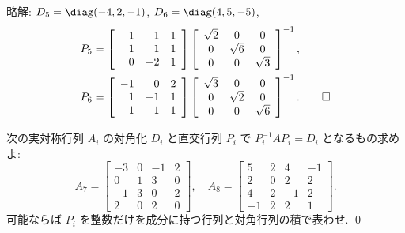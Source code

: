 \documentclass[12pt,twoside]{jarticle}
\newcommand\commentout[1]{#1}
\newcommand\commentout[1]{}
\begin{document}
\commentout{
\noindent
略解: $D_5=\diag(-4,2,-1)$, $D_6=\diag(4,5,-5)$, 
\begin{align*}
  &
  P_5 = 
  \left[ 
    \begin{array}{rrr}
      -1 & 1 & 1 \\
      1 & 1 & 1 \\
      0 & -2 & 1
    \end{array}
  \right]
  \left[ 
    \begin{array}{ccc}
      \sqrt {2} & 0 & 0 \\
      0 & \sqrt {6} & 0 \\
      0 & 0 & \sqrt {3}
    \end{array}
  \right]^{-1},
  \\ &
  P_6 =
  \left[ 
    \begin{array}{rrr}
      -1 & 0 & 2 \\
      1 & -1 & 1 \\
      1 & 1 & 1
    \end{array}
  \right]
  \left[ 
    \begin{array}{ccc}
      \sqrt {3} & 0 & 0 \\
      0 & \sqrt {2} & 0 \\
      0 & 0 & \sqrt {6}
    \end{array}
  \right]^{-1}.
  \qed
\end{align*}
}


\begin{question}
\label{q:ars-4}
  次の実対称行列 $A_i$ の対角化 $D_i$ と直交行列 $P_i$ で $P_i^{-1}AP_i=D_i$ 
  となるもの求めよ:
  \begin{equation*}
    A_7 =
    \left[ 
      \begin{array}{rrrr}
        -3 & 0 & -1 & 2 \\
        0 & 1 & 3 & 0 \\
        -1 & 3 & 0 & 2 \\
        2 & 0 & 2 & 0
      \end{array}
    \right],
    \quad
    A_8 =
    \left[ 
      \begin{array}{rrrr}
        5 & 2 & 4 & -1 \\
        2 & 0 & 2 & 2 \\
        4 & 2 & -1 & 2 \\
        -1 & 2 & 2 & 1
      \end{array}
    \right].
  \end{equation*}
  可能ならば $P_i$ を整数だけを成分に持つ行列と対角行列の積で表わせ.
  \qed
\end{question}
\end{document}
